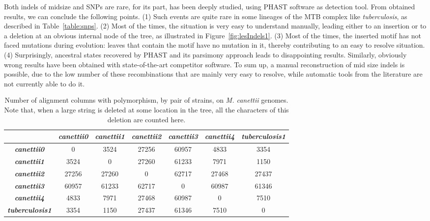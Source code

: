 \documentclass[runningheads,a4paper]{llncs}
\begin{document}
Both indels of midsize and SNPs are rare, for its part, has been deeply studied, using PHAST software as detection tool. From obtained results, we can conclude the following points. (1) Such events are quite rare in some lineages of the MTB complex like \textit{tuberculosis}, as described in Table~\ref{table:snps}. (2) Most of the times, the situation is very easy to understand manually, leading either to an insertion or to a deletion at an obvious internal node of the tree, as illustrated in Figure~\ref{fig:lesIndels1}. (3) Most of the times, the inserted motif has not faced mutations during evolution: leaves that contain the motif have no mutation in it, thereby contributing to an easy to resolve situation. (4) Surprisingly,  ancestral states recovered by PHAST and its parsimony approach leads to disappointing results. Similarly, obviously wrong results have been obtained with state-of-the-art competitor software. To sum up, a manual reconstruction of mid size indels is possible, due to the low number of these recombinations that are mainly very easy to resolve, while automatic tools from the literature are not currently able to do it.






\begin{table}[!htb]
\tiny
\centering
\caption{Number of alignment columns with polymorphism, by pair of strains, on \textit{M. canettii} genomes. Note that, when a large string is deleted at some location in the tree, all the characters of this deletion are counted here.}
\label{polymorphism_canettii3}
\begin{tabular}{|c|c|c|c|c|c|c|}
\hline
\textit{\textbf{}} & \textit{\textbf{canettii0}} & \textit{\textbf{canettii1}} & \textit{\textbf{canettii2}} & \textit{\textbf{canettii3}} & \textit{\textbf{canettii4}} & \textit{\textbf{tuberculosis1}} \\ \hline
\textit{\textbf{canettii0}} &0&3524&27256&60957&4833&3354\\ \hline
\textit{\textbf{canettii1}} &3524&0&27260&61233&7971&1150\\ \hline
\textit{\textbf{canettii2}} &27256&27260&0&62717&27468&27437 \\ \hline
\textit{\textbf{canettii3}} &60957&61233&62717&0&60987&61346  \\ \hline
\textit{\textbf{canettii4}} &4833&7971&27468&60987&0&7510   \\ \hline
\textit{\textbf{tuberculosis1}} &3354&1150&27437&61346&7510&0   \\ \hline
\end{tabular}
\end{table}
\end{document}

